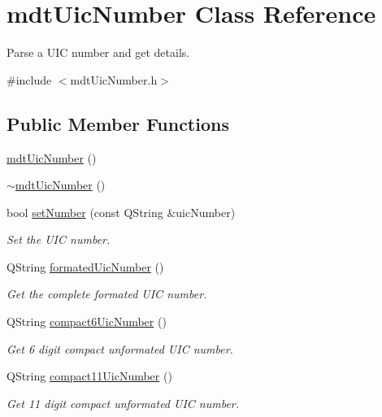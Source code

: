 \hypertarget{classmdt_uic_number}{\section{mdt\-Uic\-Number Class Reference}
\label{classmdt_uic_number}
}


Parse a U\-I\-C number and get details.  




{\ttfamily \#include $<$mdt\-Uic\-Number.\-h$>$}

\subsection*{Public Member Functions}
\begin{DoxyCompactItemize}
\item 
\hyperlink{classmdt_uic_number_a94c4feebccb321bef873f193de1a1233}{mdt\-Uic\-Number} ()
\item 
\hyperlink{classmdt_uic_number_adc0a1c93fca982de4e7e014fea5fdd34}{$\sim$mdt\-Uic\-Number} ()
\item 
bool \hyperlink{classmdt_uic_number_aadf50072784344824c696da7cff5b445}{set\-Number} (const Q\-String \&uic\-Number)
\begin{DoxyCompactList}\small\item\em Set the U\-I\-C number. \end{DoxyCompactList}\item 
Q\-String \hyperlink{classmdt_uic_number_a0eda9b614e91b32c0d99bc016d906eae}{formated\-Uic\-Number} ()
\begin{DoxyCompactList}\small\item\em Get the complete formated U\-I\-C number. \end{DoxyCompactList}\item 
Q\-String \hyperlink{classmdt_uic_number_ac213145f98f8373d3300f4b3d46881cc}{compact6\-Uic\-Number} ()
\begin{DoxyCompactList}\small\item\em Get 6 digit compact unformated U\-I\-C number. \end{DoxyCompactList}\item 
Q\-String \hyperlink{classmdt_uic_number_a1923dbc9f382433d3d669b32aac75888}{compact11\-Uic\-Number} ()
\begin{DoxyCompactList}\small\item\em Get 11 digit compact unformated U\-I\-C number. \end{DoxyCompactList}\item 

\end{DoxyCompactItemize}
